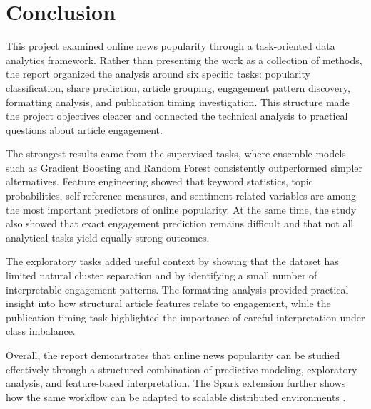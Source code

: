\section{Conclusion}

This project examined online news popularity through a task-oriented data analytics framework. Rather than presenting the work as a collection of methods, the report organized the analysis around six specific tasks: popularity classification, share prediction, article grouping, engagement pattern discovery, formatting analysis, and publication timing investigation. This structure made the project objectives clearer and connected the technical analysis to practical questions about article engagement.

The strongest results came from the supervised tasks, where ensemble models such as Gradient Boosting and Random Forest consistently outperformed simpler alternatives. Feature engineering showed that keyword statistics, topic probabilities, self-reference measures, and sentiment-related variables are among the most important predictors of online popularity. At the same time, the study also showed that exact engagement prediction remains difficult and that not all analytical tasks yield equally strong outcomes.

The exploratory tasks added useful context by showing that the dataset has limited natural cluster separation and by identifying a small number of interpretable engagement patterns. The formatting analysis provided practical insight into how structural article features relate to engagement, while the publication timing task highlighted the importance of careful interpretation under class imbalance.

Overall, the report demonstrates that online news popularity can be studied effectively through a structured combination of predictive modeling, exploratory analysis, and feature-based interpretation. The Spark extension further shows how the same workflow can be adapted to scalable distributed environments \cite{zaharia2016spark}.
